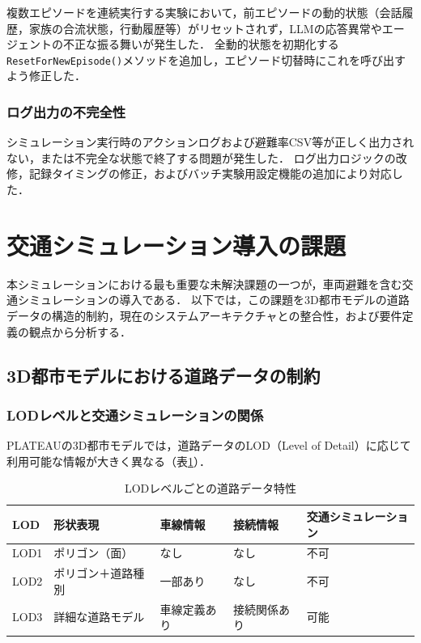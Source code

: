 \documentclass[a4paper,11pt]{jsarticle}
\begin{document}
複数エピソードを連続実行する実験において，前エピソードの動的状態（会話履歴，家族の合流状態，行動履歴等）がリセットされず，LLMの応答異常やエージェントの不正な振る舞いが発生した．
全動的状態を初期化する\texttt{ResetForNewEpisode()}メソッドを追加し，エピソード切替時にこれを呼び出すよう修正した．

\subsubsection{ログ出力の不完全性}

シミュレーション実行時のアクションログおよび避難率CSV等が正しく出力されない，または不完全な状態で終了する問題が発生した．
ログ出力ロジックの改修，記録タイミングの修正，およびバッチ実験用設定機能の追加により対応した．

\section{交通シミュレーション導入の課題}

本シミュレーションにおける最も重要な未解決課題の一つが，車両避難を含む交通シミュレーションの導入である．
以下では，この課題を3D都市モデルの道路データの構造的制約，現在のシステムアーキテクチャとの整合性，および要件定義の観点から分析する．

\subsection{3D都市モデルにおける道路データの制約}

\subsubsection{LODレベルと交通シミュレーションの関係}

PLATEAUの3D都市モデルでは，道路データのLOD（Level of Detail）に応じて利用可能な情報が大きく異なる（表\ref{tab:lod}）．

\begin{table}[htbp]
\centering
\caption{LODレベルごとの道路データ特性}
\label{tab:lod}
\begin{tabularx}{\textwidth}{lXXXX}
\toprule
LOD & 形状表現 & 車線情報 & 接続情報 & 交通シミュレーション \\
\midrule
LOD1 & ポリゴン（面） & なし & なし & 不可 \\
LOD2 & ポリゴン＋道路種別 & 一部あり & なし & 不可 \\
LOD3 & 詳細な道路モデル & 車線定義あり & 接続関係あり & 可能 \\
\bottomrule
\end{tabularx}
\end{table}
\end{document}
